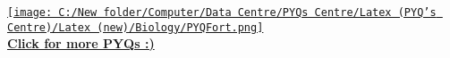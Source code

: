 \documentclass[12pt,a4paper]{article}
\begin{document}
\vspace{2\baselineskip}

\begin{center}
    \href{https://github.com/Saumy1905/PYQFort}{%
        \texttt{[image: C:/New folder/Computer/Data Centre/PYQs Centre/Latex (PYQ's Centre)/Latex (new)/Biology/PYQFort.png]} \\
        \vspace{0.5em}
        \textbf{Click for more PYQs :)}
    }
\end{center}
\end{document}
